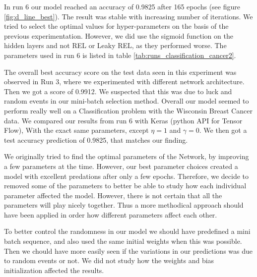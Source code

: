 
In run 6 our model reached an accuracy of 0.9825 after 165 epochs (see figure
\ref{fig:d_line_best}). The result was stable
with increasing number of iterations. We tried to select the optimal values for
hyper-parameters on the basis of the previous experimentation. However, we did
use the sigmoid function on the hidden layers and not REL or Leaky REL, as
they performed worse. The parameters used in run 6 is listed in table
\ref{tab:runs_classification_cancer2}. 

The overall best accuracy score on the test data seen in this experiment was observed in Run
3, where we experimented with different network architecture. Then we got a
score of 0.9912. We suspected that this was due to luck and random events in
our mini-batch selection method. 
Overall our model seemed to perform really well on a Classification problem
with the Wisconsin Breast Cancer data. We compared our results from run 6 with Keras
(python API for Tensor Flow), With the exact same parameters, except $\eta =
1$ and $\gamma = 0$. We then got a test accuracy prediction of 0.9825, that
matches our finding. 


We originally tried to find the optimal parameters of the Network, by improving
a few parameters at the time. However, our best parameter choices created a
model with excellent predations after only a few epochs. Therefore, we decide
to removed some of the parameters to better be able to study how each individual
parameter affected the model. However, there is not certain that all the
parameters will play nicely together. Thus a more methodical approach should
have been applied in order how different parameters affect each other.     

To better control the randomness in our model we should have predefined a
mini batch sequence, and also used the same initial weights when this was
possible. Then we chould have more easily seen if the variations in our
predictions was due to random events or not. We did not study how the weights
and bias initialization affected the results. 



